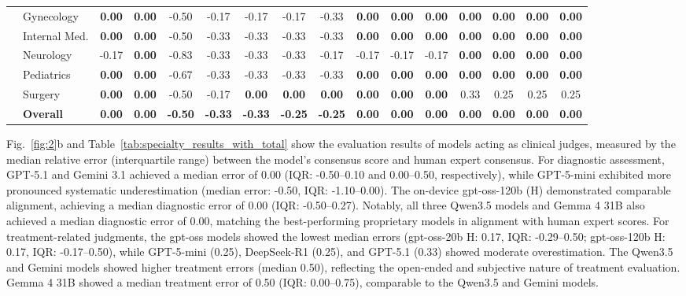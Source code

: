 \documentclass[10pt,journal,compsoc, onecolumn]{IEEEtran}
\newcommand{\best}[1]{\textbf{#1}}
\begin{document}
\begin{table}[!htbp]
\begin{tabular}{ll ccc @{\hskip 6pt} c @{\hskip 6pt} ccc @{\hskip 6pt} ccc @{\hskip 6pt} ccc @{\hskip 6pt} c}
& Gynecology & \best{0.00} & \best{0.00} & -0.50 & -0.17 & -0.17 & -0.17 & -0.33 & \best{0.00} & \best{0.00} & \best{0.00} & \best{0.00} & \best{0.00} & \best{0.00} & \best{0.00} \\
& Internal Med. & \best{0.00} & \best{0.00} & -0.50 & -0.33 & -0.33 & -0.33 & -0.33 & \best{0.00} & \best{0.00} & \best{0.00} & \best{0.00} & \best{0.00} & \best{0.00} & \best{0.00} \\
& Neurology & -0.17 & \best{0.00} & -0.83 & -0.33 & -0.33 & -0.33 & -0.17 & -0.17 & -0.17 & -0.17 & \best{0.00} & \best{0.00} & \best{0.00} & \best{0.00} \\
& Pediatrics & \best{0.00} & \best{0.00} & -0.67 & -0.33 & -0.33 & -0.33 & -0.33 & \best{0.00} & \best{0.00} & \best{0.00} & \best{0.00} & \best{0.00} & \best{0.00} & \best{0.00} \\
& Surgery & \best{0.00} & \best{0.00} & -0.50 & -0.17 & \best{0.00} & \best{0.00} & \best{0.00} & \best{0.00} & \best{0.00} & \best{0.00} & 0.33 & 0.25 & 0.25 & 0.25 \\
\cmidrule{2-16}
& \textbf{Overall} & \textbf{\best{0.00}} & \textbf{\best{0.00}} & \textbf{-0.50} & \textbf{-0.33} & \textbf{-0.33} & \textbf{-0.25} & \textbf{-0.25} & \textbf{\best{0.00}} & \textbf{\best{0.00}} & \textbf{\best{0.00}} & \textbf{\best{0.00}} & \textbf{\best{0.00}} & \textbf{\best{0.00}} & \textbf{\best{0.00}} \\
\bottomrule
\end{tabular}
\end{table}

Fig.~\ref{fig:2}b and Table~\ref{tab:specialty_results_with_total} show the evaluation results of models acting as clinical judges, measured by the median relative error (interquartile range) between the model's consensus score and human expert consensus. For diagnostic assessment, GPT-5.1 and Gemini 3.1 achieved a median error of 0.00 (IQR: -0.50--0.10 and 0.00--0.50, respectively), while GPT-5-mini exhibited more pronounced systematic underestimation (median error: -0.50, IQR: -1.10--0.00). The on-device gpt-oss-120b (H) demonstrated comparable alignment, achieving a median diagnostic error of 0.00 (IQR: -0.50--0.27). Notably, all three Qwen3.5 models and Gemma 4 31B also achieved a median diagnostic error of 0.00, matching the best-performing proprietary models in alignment with human expert scores. For treatment-related judgments, the gpt-oss models showed the lowest median errors (gpt-oss-20b H: 0.17, IQR: -0.29--0.50; gpt-oss-120b H: 0.17, IQR: -0.17--0.50), while GPT-5-mini (0.25), DeepSeek-R1 (0.25), and GPT-5.1 (0.33) showed moderate overestimation. The Qwen3.5 and Gemini models showed higher treatment errors (median 0.50), reflecting the open-ended and subjective nature of treatment evaluation. Gemma 4 31B showed a median treatment error of 0.50 (IQR: 0.00--0.75), comparable to the Qwen3.5 and Gemini models.
\end{document}
